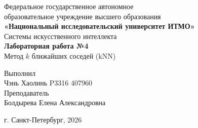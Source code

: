 \begin{titlepage}
    \centering
    Федеральное государственное автономное\\
    образовательное учреждение высшего образования\\
    \textbf{«Национальный исследовательский университет ИТМО»}\\
    \vfill
    Системы искусственного интеллекта\\
    \vspace{0.5\baselineskip}
    \textbf{Лабораторная работа №4}\\
    \vspace{0.5\baselineskip}
    Метод \(k\) ближайших соседей (kNN)\\
    \vfill
    \begin{flushright}
    Выполнил\\
    Чэнь Хаолинь P3316 407960\\[0.5\baselineskip]
    Преподаватель\\
    Болдырева Елена Александровна
    \end{flushright}
    \vspace{4\baselineskip}
    г. Санкт-Петербург, 2026
\end{titlepage}
